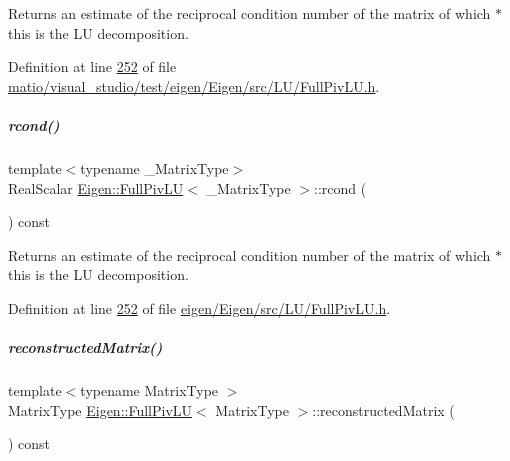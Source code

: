 \begin{DoxyReturn}{Returns}
an estimate of the reciprocal condition number of the matrix of which {\ttfamily $\ast$this} is the LU decomposition. 
\end{DoxyReturn}


Definition at line \hyperlink{matio_2visual__studio_2test_2eigen_2_eigen_2src_2_l_u_2_full_piv_l_u_8h_source_l00252}{252} of file \hyperlink{matio_2visual__studio_2test_2eigen_2_eigen_2src_2_l_u_2_full_piv_l_u_8h_source}{matio/visual\+\_\+studio/test/eigen/\+Eigen/src/\+L\+U/\+Full\+Piv\+L\+U.\+h}.

\mbox{\label{group___l_u___module_a0bc63f910960dc3e35acecc8442025b6}} 
\subparagraph{\texorpdfstring{rcond()}{rcond()}\hspace{0.1cm}{\footnotesize\ttfamily [2/2]}}
{\footnotesize\ttfamily template$<$typename \+\_\+\+Matrix\+Type$>$ \\
Real\+Scalar \hyperlink{group___l_u___module_class_eigen_1_1_full_piv_l_u}{Eigen\+::\+Full\+Piv\+LU}$<$ \+\_\+\+Matrix\+Type $>$\+::rcond (\begin{DoxyParamCaption}{ }\end{DoxyParamCaption}) const\hspace{0.3cm}{\ttfamily [inline]}}

\begin{DoxyReturn}{Returns}
an estimate of the reciprocal condition number of the matrix of which {\ttfamily $\ast$this} is the LU decomposition. 
\end{DoxyReturn}


Definition at line \hyperlink{eigen_2_eigen_2src_2_l_u_2_full_piv_l_u_8h_source_l00252}{252} of file \hyperlink{eigen_2_eigen_2src_2_l_u_2_full_piv_l_u_8h_source}{eigen/\+Eigen/src/\+L\+U/\+Full\+Piv\+L\+U.\+h}.

\mbox{\label{group___l_u___module_a191a4f598b0c192a83ab48984e87ee51}} 
\subparagraph{\texorpdfstring{reconstructed\+Matrix()}{reconstructedMatrix()}}
{\footnotesize\ttfamily template$<$typename Matrix\+Type $>$ \\
Matrix\+Type \hyperlink{group___l_u___module_class_eigen_1_1_full_piv_l_u}{Eigen\+::\+Full\+Piv\+LU}$<$ Matrix\+Type $>$\+::reconstructed\+Matrix (\begin{DoxyParamCaption}{ }\end{DoxyParamCaption}) const}

